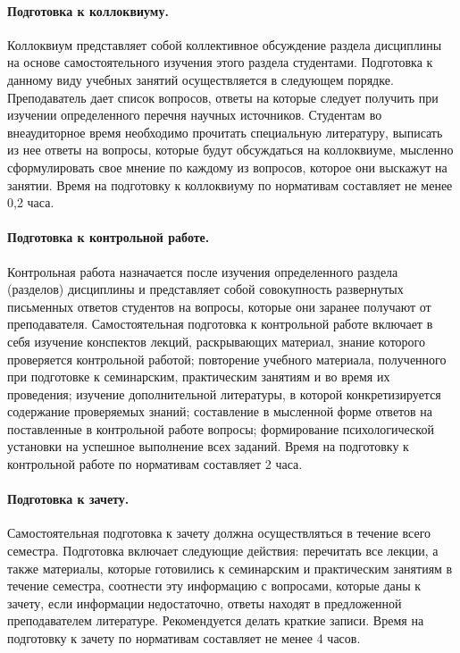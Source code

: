 {\paragraph{Подготовка к коллоквиуму.} Коллоквиум представляет собой коллективное
обсуждение раздела дисциплины на основе самостоятельного изучения этого раздела
студентами. Подготовка к данному виду учебных занятий осуществляется в следующем
порядке. Преподаватель дает список вопросов, ответы на которые следует получить при
изучении определенного перечня научных источников. Студентам во внеаудиторное
время необходимо прочитать специальную литературу, выписать из нее ответы на
вопросы, которые будут обсуждаться на коллоквиуме, мысленно сформулировать свое
мнение по каждому из вопросов, которое они выскажут на занятии. Время на подготовку к
коллоквиуму по нормативам составляет не менее 0,2 часа.\par
\paragraph{Подготовка к контрольной работе.} Контрольная работа назначается после
изучения определенного раздела (разделов) дисциплины и представляет собой
совокупность развернутых письменных ответов студентов на вопросы, которые они
заранее получают от преподавателя. Самостоятельная подготовка к контрольной работе
включает в себя изучение конспектов лекций, раскрывающих материал, знание
которого проверяется контрольной работой; повторение учебного материала, полученного
при подготовке к семинарским, практическим занятиям и во время их проведения;
изучение дополнительной литературы, в которой конкретизируется содержание
проверяемых знаний; составление в мысленной форме ответов на поставленные в
контрольной работе вопросы; формирование психологической установки на успешное
выполнение всех заданий. Время на подготовку к контрольной работе по нормативам
составляет 2 часа.\par
\paragraph{Подготовка к зачету.} Самостоятельная подготовка к зачету должна
осуществляться в течение всего семестра. Подготовка включает следующие действия:
перечитать все лекции, а также материалы, которые готовились к семинарским и
практическим занятиям в течение семестра, соотнести эту информацию с вопросами,
которые даны к зачету, если информации недостаточно, ответы находят в предложенной
преподавателем литературе. Рекомендуется делать краткие записи. Время на подготовку к
зачету по нормативам составляет не менее 4 часов.\par
}
